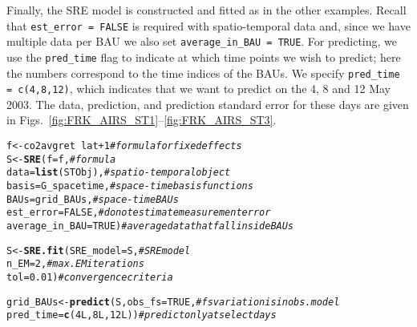 \documentclass{article}\usepackage[]{graphicx}\usepackage[]{color}
\makeatletter
\newcommand{\hlnum}[1]{\textcolor[rgb]{0.686,0.059,0.569}{#1}}%
\newcommand{\hlcom}[1]{\textcolor[rgb]{0.678,0.584,0.686}{\textit{#1}}}%
\newcommand{\hlopt}[1]{\textcolor[rgb]{0,0,0}{#1}}%
\newcommand{\hlstd}[1]{\textcolor[rgb]{0.345,0.345,0.345}{#1}}%
\newcommand{\hlkwb}[1]{\textcolor[rgb]{0.69,0.353,0.396}{#1}}%
\newcommand{\hlkwc}[1]{\textcolor[rgb]{0.333,0.667,0.333}{#1}}%
\newcommand{\hlkwd}[1]{\textcolor[rgb]{0.737,0.353,0.396}{\textbf{#1}}}%
\newenvironment{kframe}{%
 \def\at@end@of@kframe{}%
 \ifinner\ifhmode%
  \def\at@end@of@kframe{\end{minipage}}%
  \begin{minipage}{\columnwidth}%
 \fi\fi%
 \def\FrameCommand##1{\hskip\@totalleftmargin \hskip-\fboxsep
 \colorbox{shadecolor}{##1}\hskip-\fboxsep
     \hskip-\linewidth \hskip-\@totalleftmargin \hskip\columnwidth}%
 \MakeFramed {\advance\hsize-\width
   \@totalleftmargin\z@ \linewidth\hsize
   \@setminipage}}%
 {\par\unskip\endMakeFramed%
 \at@end@of@kframe}
\newenvironment{knitrout}{}{} %
\renewcommand{\tt} {\texttt}
\makeatother
\begin{document}
\vspace{0.1in}

 Finally, the SRE model is constructed and fitted as in the other examples. Recall that \tt{est\_error = FALSE} is required with spatio-temporal data and, since we have multiple data per BAU we also set \tt{average\_in\_BAU = TRUE}. For predicting, we use the \tt{pred\_time} flag to indicate at which time points we wish to predict; here the numbers correspond to the time indices of the BAUs. We specify \tt{pred\_time = c(4,8,12)}, which indicates that we want to predict on the 4, 8 and 12 May 2003. The data, prediction, and prediction standard error for these days are given in Figs.~\ref{fig:FRK_AIRS_ST1}--\ref{fig:FRK_AIRS_ST3}.

\begin{knitrout}
\color{fgcolor}\begin{kframe}
\begin{alltt}
\hlstd{f} \hlkwb{<-} \hlstd{co2avgret} \hlopt{~} \hlstd{lat} \hlopt{+}\hlnum{1}           \hlcom{# formula for fixed effects}
\hlstd{S} \hlkwb{<-} \hlkwd{SRE}\hlstd{(}\hlkwc{f} \hlstd{= f,}                   \hlcom{# formula}
         \hlkwc{data} \hlstd{=} \hlkwd{list}\hlstd{(STObj),}      \hlcom{# spatio-temporal object}
         \hlkwc{basis} \hlstd{= G_spacetime,}     \hlcom{# space-time basis functions}
         \hlkwc{BAUs} \hlstd{= grid_BAUs,}        \hlcom{# space-time BAUs}
         \hlkwc{est_error} \hlstd{=} \hlnum{FALSE}\hlstd{,}       \hlcom{# do not estimate measurement error}
         \hlkwc{average_in_BAU} \hlstd{=} \hlnum{TRUE}\hlstd{)}   \hlcom{# average data that fall inside BAUs}

\hlstd{S} \hlkwb{<-} \hlkwd{SRE.fit}\hlstd{(}\hlkwc{SRE_model} \hlstd{= S,}       \hlcom{# SRE model}
             \hlkwc{n_EM} \hlstd{=} \hlnum{2}\hlstd{,}          \hlcom{# max. EM iterations}
             \hlkwc{tol} \hlstd{=} \hlnum{0.01}\hlstd{)}          \hlcom{# convergence criteria}

\hlstd{grid_BAUs} \hlkwb{<-} \hlkwd{predict}\hlstd{(S,} \hlkwc{obs_fs} \hlstd{=} \hlnum{TRUE}\hlstd{,}         \hlcom{# fs variation is in obs. model}
                     \hlkwc{pred_time} \hlstd{=} \hlkwd{c}\hlstd{(}\hlnum{4L}\hlstd{,}\hlnum{8L}\hlstd{,}\hlnum{12L}\hlstd{))} \hlcom{# predict only at select days}
\end{alltt}
\end{kframe}
\end{knitrout}
\end{document}
